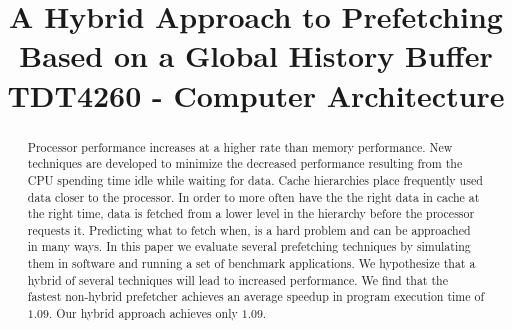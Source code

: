\documentclass[technote]{IEEEtran}
\begin{document}
\title{A Hybrid Approach to Prefetching Based on a Global History Buffer\\ TDT4260 - Computer Architecture}

\author{

}

\maketitle

\begin{abstract}
  Processor performance increases at a higher rate than memory
  performance. New techniques are developed to minimize the decreased
  performance resulting from the CPU spending time idle while waiting
  for data. Cache hierarchies place frequently used data closer to the
  processor. In order to more often have the the right data in cache
  at the right time, data is fetched from a lower level in the
  hierarchy before the processor requests it. Predicting what to fetch
  when, is a hard problem and can be approached in many ways. In this
  paper we evaluate several prefetching techniques by simulating them
  in software and running a set of benchmark applications. We
  hypothesize that a hybrid of several techniques will lead to
  increased performance. We find that the fastest non-hybrid
  prefetcher achieves an average speedup in program execution time of
  $1.09$. Our hybrid approach achieves only $1.09$.
\end{abstract}










\end{document}
